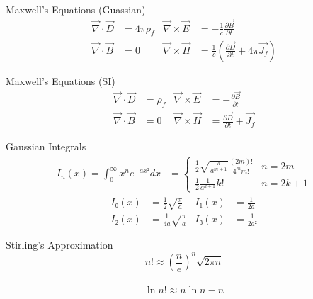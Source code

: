 \documentclass[avery5371,grid]{flashcards}
\begin{document}


\begin{flashcard}{Maxwell's Equations (Guassian)}
	\begin{align*}
		\vec ∇ · \vec D &= 4πρ_f
			& \vec ∇ × \vec E &= -\frac 1c \frac{∂\vec B}{∂t}
		\\
		\vec ∇ · \vec B &= 0
			& \vec ∇ × \vec H &= \frac 1c ( \frac{∂\vec D}{∂t} + 4π \vec{J_f} )
	\end{align*}
\end{flashcard}

\begin{flashcard}{Maxwell's Equations (SI)}
	\begin{align*}
		\vec ∇ · \vec D &= ρ_f
			& \vec ∇ × \vec E &= -\frac{∂\vec B}{∂t}
		\\
		\vec ∇ · \vec B &= 0
			& \vec ∇ × \vec H &= \frac{∂\vec D}{∂t} + \vec{J_f}
	\end{align*}
\end{flashcard}


\begin{flashcard}{Gaussian Integrals}
	\begin{align*}
		I_n(x) = \!\! ∫_0^∞ \!\! x^n e^{-ax²} dx &=
			\begin{cases}
				\displaystyle
				\frac{1}{2} \sqrt{\frac{π}{a^{m+1}}} \frac{(2m)!}{4^m m!}
					& \text{$n = 2m$} \\
				\displaystyle
				\frac{1}{2} \frac{1}{a^{k+1}} k!
					& \text{$n = 2k + 1$}
			\end{cases}
	\end{align*}
	\vspace{-\baselineskip}
	\begin{align*}
		I₀(x) &= \frac 12 \sqrt{\frac π a}
			& I₁(x) &= \frac 1 {2a} \\
		I₂(x) &= \frac{1}{4a} \sqrt{\frac π a}
			& I₃(x) &= \frac 1 {2a²}
	\end{align*}
\end{flashcard}

\begin{flashcard}{Stirling's Approximation}
	\[ n! ≈ (\frac ne)^n \sqrt{2πn} \] \\
	\[ \ln n! ≈ n\ln n - n \]
\end{flashcard}
\end{document}
